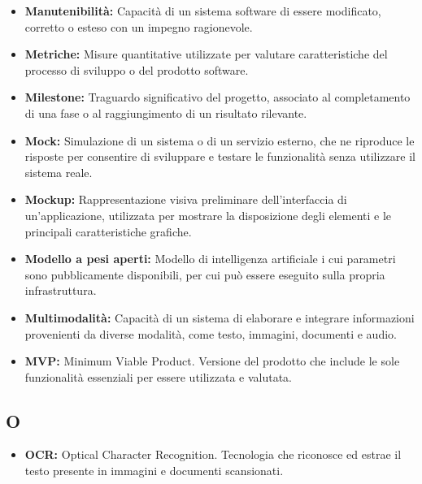 \begin{itemize}
    \item \textbf{Manutenibilità:} Capacità di un sistema software di essere modificato, corretto o esteso con un impegno ragionevole.
    \item \textbf{Metriche:} Misure quantitative utilizzate per valutare caratteristiche del processo di sviluppo o del prodotto software.
    \item \textbf{Milestone:} Traguardo significativo del progetto, associato al completamento di una fase o al raggiungimento di un risultato rilevante.
    \item \textbf{Mock:} Simulazione di un sistema o di un servizio esterno, che ne riproduce le risposte per consentire di sviluppare e testare le funzionalità senza utilizzare il sistema reale.
    \item \textbf{Mockup:} Rappresentazione visiva preliminare dell'interfaccia di un'applicazione, utilizzata per mostrare la disposizione degli elementi e le principali caratteristiche grafiche.
    \item \textbf{Modello a pesi aperti:} Modello di intelligenza artificiale i cui parametri sono pubblicamente disponibili, per cui può essere eseguito sulla propria infrastruttura.
    \item \textbf{Multimodalità:} Capacità di un sistema di elaborare e integrare informazioni provenienti da diverse modalità, come testo, immagini, documenti e audio.
    \item \textbf{MVP:} Minimum Viable Product. Versione del prodotto che include le sole funzionalità essenziali per essere utilizzata e valutata.
\end{itemize}


{}
\subsection*{O}

\begin{itemize}
    \item \textbf{OCR:} Optical Character Recognition. Tecnologia che riconosce ed estrae il testo presente in immagini e documenti scansionati.
\end{itemize}


{}
